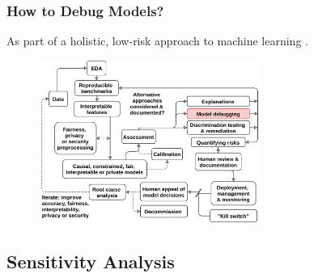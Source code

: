 \documentclass[11pt,
               aspectratio=169,
               hyperref={colorlinks}
               ]{beamer}
\begin{document}
			\begin{frame}
		
				\frametitle{How to Debug Models?}
		
				\footnotesize{As part of a holistic, low-risk approach to machine learning \cite{information}.}
				\begin{figure}
					\begin{center}
						\includegraphics[height=150pt]{img/blueprint.png}
					\end{center}
				\end{figure}	
				\normalsize
		
			\end{frame}

		\subsection{Sensitivity Analysis}
\end{document}
